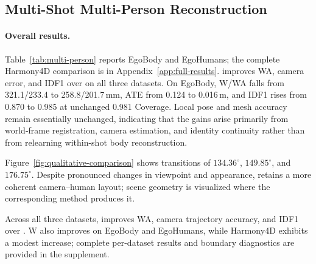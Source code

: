 

\subsection{Multi-Shot Multi-Person Reconstruction}
\label{sec:main-results}

\paragraph{Overall results.}
Table~\ref{tab:multi-person} reports EgoBody and EgoHumans; the complete
Harmony4D comparison is in Appendix~\ref{app:full-results}. \method{}
improves WA, camera error, and IDF1 over \humanthree{} on all three datasets.
On EgoBody, W/WA falls from 321.1/233.4 to 258.8/201.7\,mm, ATE from 0.124 to
0.016\,m, and IDF1 rises from 0.870 to 0.985 at unchanged 0.981 Coverage.
Local pose and mesh accuracy remain essentially unchanged, indicating that
the gains arise primarily from world-frame registration, camera estimation,
and identity continuity rather than from relearning within-shot body
reconstruction.

Figure~\ref{fig:qualitative-comparison} shows transitions of
$134.36^\circ$, $149.85^\circ$, and $176.75^\circ$. Despite pronounced changes
in viewpoint and appearance, \method{} retains a more coherent camera--human
layout; scene geometry is visualized where the corresponding method produces it.

Across all three datasets, \method{} improves WA, camera trajectory accuracy,
and IDF1 over \humanthree{}. W also improves on EgoBody and EgoHumans, while
Harmony4D exhibits a modest increase; complete per-dataset results and
boundary diagnostics are provided in the supplement.

